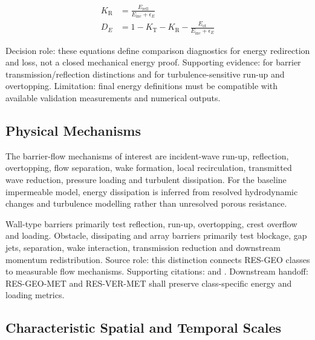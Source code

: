 \begin{align}
  K_{\mathrm{R}}
  &=
  \frac{
    E_{\mathrm{refl}}
  }{
    E_{\mathrm{inc}}
    +
    \epsilon_E
  }
  \label{eq:res-phy-bar-reflection-measure}
  \\
  D_E
  &=
  1
  -
  K_{\mathrm{T}}
  -
  K_{\mathrm{R}}
  -
  \frac{
    E_{\mathrm{ot}}
  }{
    E_{\mathrm{inc}}
    +
    \epsilon_E
  }
  \label{eq:res-phy-bar-apparent-dissipation-measure}
\end{align}

Decision role: these equations define comparison diagnostics for
energy redirection and loss, not a closed mechanical energy proof.
Supporting evidence: \textcite{deljesus2012porous} for barrier
transmission/reflection distinctions and \textcite{kozelkov2022turbulence}
for turbulence-sensitive run-up and overtopping. Limitation: final
energy definitions must be compatible with available validation
measurements and numerical outputs.

\subsection{Physical Mechanisms}
\label{sec:res-phy-bar-physical-mechanisms}


The barrier-flow mechanisms of interest are incident-wave run-up,
reflection, overtopping, flow separation, wake formation, local
recirculation, transmitted wave reduction, pressure loading and
turbulent dissipation. For the baseline impermeable model, energy
dissipation is inferred from resolved hydrodynamic changes and
turbulence modelling rather than unresolved porous resistance.

Wall-type barriers primarily test reflection, run-up, overtopping,
crest overflow and loading. Obstacle, dissipating and array barriers
primarily test blockage, gap jets, separation, wake interaction,
transmission reduction and downstream momentum redistribution. Source
role: this distinction connects RES-GEO classes to measurable flow
mechanisms. Supporting citations: \textcite{deljesus2012porous} and
\textcite{watanabe2022validation}. Downstream handoff: RES-GEO-MET and
RES-VER-MET shall preserve class-specific energy and loading metrics.

\subsection{Characteristic Spatial and Temporal Scales}
\label{sec:res-phy-bar-characteristic-spatial-temporal-scales}

